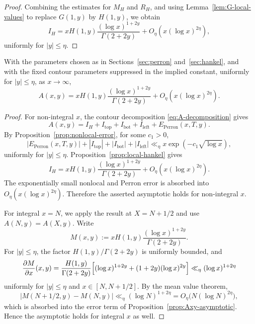 \begin{proof}
Combining the estimates for $M_H$ and $R_H$, and using
Lemma~\ref{lem:G-local-values} to replace $G(1,y)$ by $H(1,y)$,
we obtain
\[
    I_H
    =
    xH(1,y)\frac{(\log x)^{1+2y}}{\Gamma(2+2y)}
    +O_\eta(x(\log x)^{2\eta}),
\]
uniformly for $|y|\leq\eta$.
\end{proof}

\begin{proposition}
\label{prop:Axy-asymptotic}
With the parameters chosen as in Sections~\ref{sec:perron}
and~\ref{sec:hankel}, and with the fixed contour parameters
suppressed in the implied constant, uniformly for $|y|\leq\eta$,
as $x\to\infty$,
\[
    A(x,y)
    =
    xH(1,y)
    \frac{(\log x)^{1+2y}}{\Gamma(2+2y)}
    +O_\eta\left(x(\log x)^{2\eta}\right).
\]
\end{proposition}

\begin{proof}
For non-integral $x$, the contour decomposition
\eqref{eq:A-decomposition} gives
\[
    A(x,y)
    =
    I_H+I_{\mathrm{top}}+I_{\mathrm{bot}}+I_{\mathrm{left}}
    +E_{\mathrm{Perron}}(x,T,y).
\]
By Proposition~\ref{prop:nonlocal-error}, for some $c_1>0$,
\[
    |E_{\mathrm{Perron}}(x,T,y)|
    +|I_{\mathrm{top}}|+|I_{\mathrm{bot}}|+|I_{\mathrm{left}}|
    \ll_\eta
    x\exp(-c_1\sqrt{\log x}),
\]
uniformly for $|y|\leq\eta$. Proposition~\ref{prop:local-hankel}
gives
\[
    I_H
    =
    xH(1,y)
    \frac{(\log x)^{1+2y}}{\Gamma(2+2y)}
    +O_\eta\left(x(\log x)^{2\eta}\right).
\]
The exponentially small nonlocal and Perron error is absorbed into
$O_\eta(x(\log x)^{2\eta})$. Therefore the asserted asymptotic
holds for non-integral $x$.

For integral $x = N$, we apply the result at $X = N + 1/2$ and use
$A(N, y) = A(X, y)$. Write
\[
    M(x, y) := x H(1, y)\frac{(\log x)^{1+2y}}{\Gamma(2+2y)}.
\]
For $|y| \leq \eta$, the factor $H(1,y)/\Gamma(2+2y)$ is uniformly
bounded, and
\[
    \frac{\partial M}{\partial x}(x, y)
    = \frac{H(1,y)}{\Gamma(2+2y)}
      \Bigl[(\log x)^{1+2y} + (1+2y)(\log x)^{2y}\Bigr]
    \ll_\eta (\log x)^{1+2\eta}
\]
uniformly for $|y| \leq \eta$ and $x \in [N, N+1/2]$. By the mean
value theorem,
\[
    |M(N+1/2, y) - M(N, y)|
    \ll_\eta (\log N)^{1+2\eta}
    = O_\eta\bigl(N(\log N)^{2\eta}\bigr),
\]
which is absorbed into the error term of Proposition~\ref{prop:Axy-asymptotic}.
Hence the asymptotic holds for integral $x$ as well.
\end{proof}
